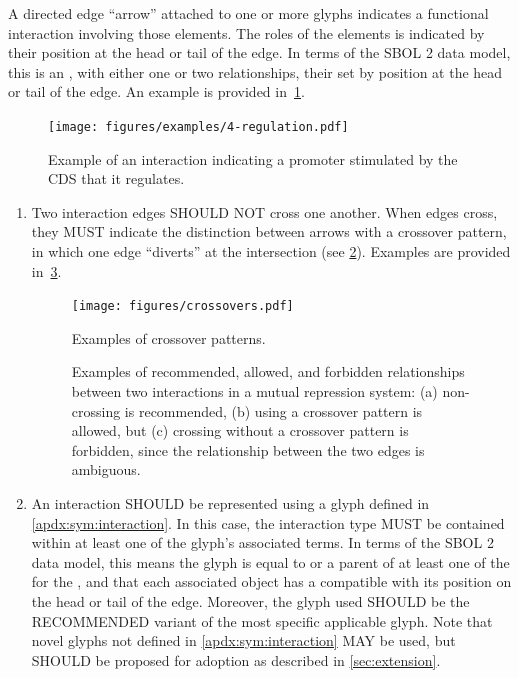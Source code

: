 A directed edge ``arrow'' attached to one or more glyphs indicates a functional interaction involving those elements.
The roles of the elements is indicated by their position at the head or tail of the edge.
In terms of the SBOL 2 data model, this is an , with either one or two  relationships, their  set by position at the head or tail of the edge.
	An example is provided in~\ref{exa:4}.

	\begin{figure}[h!]
	\centering
	\texttt{[image: figures/examples/4-regulation.pdf]}
	\caption{Example of an interaction indicating a promoter stimulated by the CDS that it regulates.}
	\label{exa:4}
	\end{figure}
		
\begin{enumerate}
\item Two interaction edges SHOULD NOT cross one another.  When edges cross, they MUST indicate the distinction between arrows with a crossover pattern, in which one edge ``diverts'' at the intersection (see \ref{f:crossover}).
Examples are provided in~\ref{exa:4c}.

	\begin{figure}[h!]
	\centering
	\texttt{[image: figures/crossovers.pdf]}
	\caption{Examples of  crossover patterns.}
	\label{f:crossover}
	\end{figure}
	
	\begin{figure}[h!]
	\centering
	\caption{Examples of recommended, allowed, and forbidden relationships between two interactions in a mutual repression system: (a) non-crossing is recommended, (b) using a crossover pattern is allowed, but (c) crossing without a crossover pattern is forbidden, since the relationship between the two edges is ambiguous.}
	\label{exa:4c}
	\end{figure}

\item An interaction SHOULD be represented using a glyph defined in \ref{apdx:sym:interaction}.  In this case, the interaction type MUST be contained within at least one of the glyph's associated terms.
In terms of the SBOL 2 data model, this means the glyph is equal to or a parent of at least one of the  for the , and that each associated  object has a  compatible with its position on the head or tail of the edge.
	Moreover, the glyph used SHOULD be the RECOMMENDED variant of the most specific applicable glyph.  Note that novel glyphs not defined in \ref{apdx:sym:interaction} MAY be used, but SHOULD be proposed for adoption as described in \ref{sec:extension}.


\end{enumerate}
